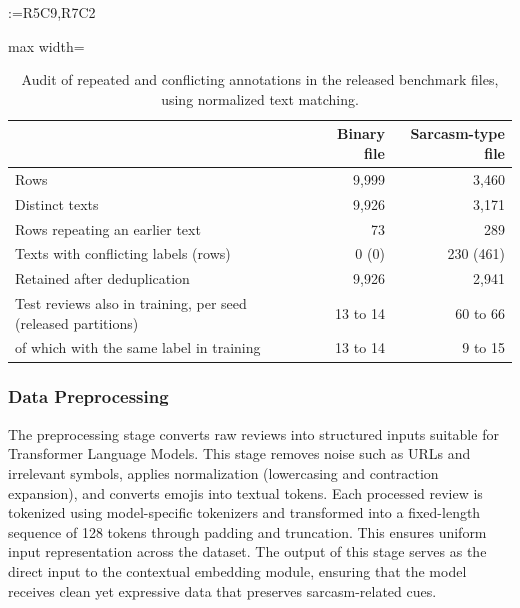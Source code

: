 \documentclass[a4paper,fleqn]{cas-sc}
\makeatletter
\newif\iftracked
\newcommand{\rv@setcolour}[1]{%
  \IfStrEq{#1}{R7C7}{\color{rvEdit}}{%
    \IfSubStr{#1}{R5}{\IfSubStr{#1}{R7}{\color{rvBoth}}{\color{rvFive}}}{\color{rvSeven}}}}
\newcommand{\rv@tag}[1]{\textsuperscript{\sffamily\bfseries\scriptsize[\StrSubstitute{#1}{,}{, }]}\,}
\newcommand{\rv@recordone}[1]{%
  \edef\rv@i{#1}%
  \ifcsdef{rv@n@\rv@i}{}{\csgdef{rv@n@\rv@i}{0}}%
  \csxdef{rv@n@\rv@i}{\the\numexpr\csuse{rv@n@\rv@i}+1\relax}%
  \begingroup\edef\@currentlabel{\rv@i}\label{rv:\rv@i:\csuse{rv@n@\rv@i}}\endgroup}
\newcommand{\rv@record}[1]{\@for\rv@id:=#1\do{\expandafter\rv@recordone\expandafter{\rv@id}}}
\DeclareRobustCommand{\rcx}[2]{\iftracked{\rv@setcolour{#1}\rv@tag{#1}#2}\else#2\fi}
\DeclareRobustCommand{\rcmark}[1]{\rv@record{#1}}
\makeatother
\begin{document}
\begin{table}[t]
\caption{\rcx{R5C9,R7C2}{Audit of repeated and conflicting annotations in the released benchmark files, using normalized text matching.}}
\rcmark{R5C9,R7C2}
\label{tab:dedup-audit}
\centering\small
\iftracked\color{rvBoth}\fi
\begin{adjustbox}{max width=\textwidth}
\begin{tabular}{lrr}
\toprule
 & Binary file & Sarcasm-type file \\
\midrule
Rows & 9,999 & 3,460 \\
Distinct texts & 9,926 & 3,171 \\
Rows repeating an earlier text & 73 & 289 \\
Texts with conflicting labels (rows) & 0 (0) & 230 (461) \\
Retained after deduplication & 9,926 & 2,941 \\
\midrule
Test reviews also in training, per seed (released partitions) & 13 to 14 & 60 to 66 \\
\quad of which with the same label in training & 13 to 14 & 9 to 15 \\
\bottomrule
\end{tabular}
\end{adjustbox}
\end{table}

\subsubsection{Data Preprocessing}
The preprocessing stage converts raw reviews into structured inputs suitable for Transformer Language Models. This stage removes noise such as URLs and irrelevant symbols, applies normalization (lowercasing and contraction expansion), and converts emojis into textual tokens. Each processed review is tokenized using model-specific tokenizers and transformed into a fixed-length sequence of 128 tokens through padding and truncation. This ensures uniform input representation across the dataset. The output of this stage serves as the direct input to the contextual embedding module, ensuring that the model receives clean yet expressive data that preserves sarcasm-related cues.
\end{document}
